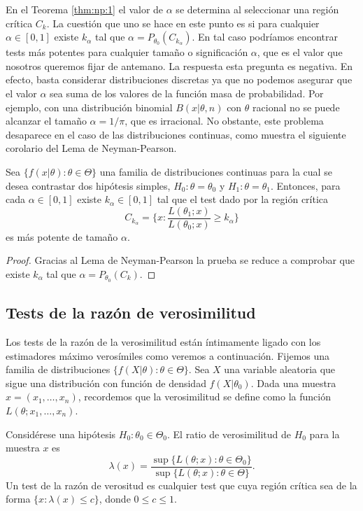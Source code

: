    En el Teorema \ref{thm:np:1} el valor de $\alpha$ se determina al seleccionar una región crítica $C_k$. La cuestión que uno se hace en este punto es si para cualquier $\alpha \in [0,1]$ existe $k_\alpha$ tal que  $\alpha = P_{\theta_0}(C_{k_\alpha})$. En tal caso podríamos encontrar tests más potentes para cualquier tamaño o significación $\alpha$, que es el valor que nosotros queremos fijar de antemano. La respuesta  esta pregunta es negativa. En efecto, basta considerar distribuciones discretas ya que no podemos asegurar que el valor $\alpha$ sea suma de los valores de la función masa de probabilidad. Por ejemplo, con una distribución binomial $B(x|\theta,n)$ con $\theta$ racional no se puede alcanzar el tamaño $\alpha = 1 / \pi$, que es irracional. No obstante, este problema desaparece en el caso de las distribuciones continuas, como muestra el siguiente corolario del Lema de Neyman-Pearson.

    \begin{cor}
        Sea $\{f(x|\theta): \theta \in \Theta\}$ una familia de distribuciones continuas para la cual se desea contrastar dos hipótesis simples, $H_0 : \theta = \theta_0$ y $H_1 : \theta = \theta_1$. Entonces, para cada $\alpha \in [0,1]$ existe $k_\alpha \in [0,1]$ tal que el test dado por la región crítica
        \[C_{k_\alpha} = \{x: \frac{L(\theta_1;x)}{L(\theta_0;x)} \ge k_\alpha\}\]
        es más potente de tamaño $\alpha$.
    \end{cor}
    \begin{proof}
        Gracias al Lema de Neyman-Pearson la prueba se reduce a comprobar que existe $k_\alpha$ tal que $\alpha = P_{\theta_0}(C_k)$.
    \end{proof}


    \subsection{Tests de la razón de verosimilitud}

    Los tests de la razón de la verosimilitud están íntimamente ligado con los estimadores máximo verosímiles como veremos a continuación. Fijemos una familia de distribuciones $\{f(X|\theta): \theta \in \Theta\}$. Sea $X$ una variable aleatoria que sigue una distribución con función de densidad $f(X | \theta_0)$. Dada una muestra $x = (x_1, \ldots, x_n)$, recordemos que la verosimilitud se define como la función
    $L(\theta;x_1, \ldots, x_n)$.

    \begin{definition}
        Considérese una hipótesis $H_0 : \theta_0 \in \Theta_0$. El ratio de verosimilitud de $H_0$ para la muestra $x$ es
        \[\lambda(x) = \frac{\sup\{L(\theta; x): \theta \in \Theta_0\}}{\sup\{L(\theta; x): \theta \in \Theta\}}. \]
         Un test de la razón de verositud es cualquier test que cuya región crítica sea de la forma $\{x : \lambda(x) \le c\}$, donde $0 \le c \le 1$.
    \end{definition}

